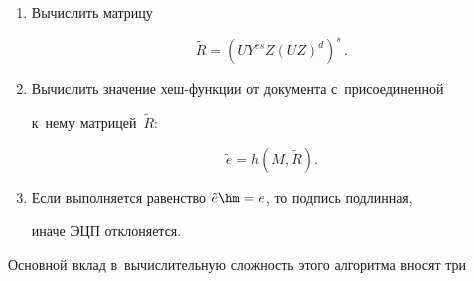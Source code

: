   \begin{enumerate}[1.]


   \item  Вычислить матрицу 


   


   \vspace*{-2pt}


   


   \noindent


   $$


   \tilde{R}=\left( UY^{es} Z(UZ)^d\right)^s\,.


   $$


   


      \vspace*{-2pt}


      


   \item Вычислить значение хеш-функ\-ции от документа с~присоединенной 


к~нему мат\-ри\-цей~$\tilde{R}$:





   \vspace*{-2pt}





\noindent


$$


\tilde{e}= h\left(M, \tilde{R}\right).


$$ 





   \vspace*{-2pt}


   


   \item Если выполняется равенство $\tilde{e}\hm=e$, то подпись подлинная, 


иначе ЭЦП отклоняется. 


   \end{enumerate}


   


      \vspace*{-2pt}


   


   Основной вклад в~вычислительную сложность этого алгоритма вносят три 



